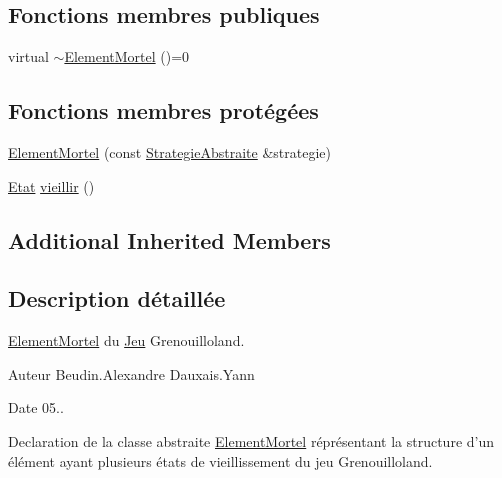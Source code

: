 \subsection*{Fonctions membres publiques}
\begin{DoxyCompactItemize}
\item 
virtual \hyperlink{classgrenouilloland_1_1ElementMortel_af3b98e89d6adca1cb01d148d9fb4da02}{$\sim$\-Element\-Mortel} ()=0
\end{DoxyCompactItemize}
\subsection*{Fonctions membres protégées}
\begin{DoxyCompactItemize}
\item 
\hyperlink{classgrenouilloland_1_1ElementMortel_afcc0659282b7c248c5546f4169a5165f}{Element\-Mortel} (const \hyperlink{classgrenouilloland_1_1StrategieAbstraite}{Strategie\-Abstraite} \&strategie)
\item 
\hyperlink{classgrenouilloland_1_1Etat}{Etat} \hyperlink{classgrenouilloland_1_1ElementMortel_a300a32cce88feb6a2bfc92c1165f9c61}{vieillir} ()
\end{DoxyCompactItemize}
\subsection*{Additional Inherited Members}


\subsection{Description détaillée}
\hyperlink{classgrenouilloland_1_1ElementMortel}{Element\-Mortel} du \hyperlink{classgrenouilloland_1_1Jeu}{Jeu} Grenouilloland. 

\begin{DoxyAuthor}{Auteur}
Beudin.\-Alexandre Dauxais.\-Yann 
\end{DoxyAuthor}
\begin{DoxyDate}{Date}
05..
\end{DoxyDate}
Declaration de la classe abstraite \hyperlink{classgrenouilloland_1_1ElementMortel}{Element\-Mortel} réprésentant la structure d'un élément ayant plusieurs états de vieillissement du jeu Grenouilloland. 

